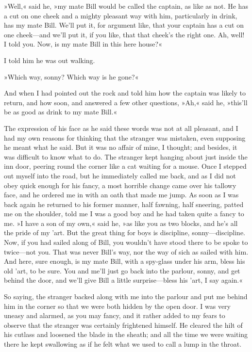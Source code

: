 »Well,« said he, »my mate Bill would be called the captain, as like as not. He has a cut on one cheek and a mighty pleasant way with him, particularly in drink, has my mate Bill. We'll put it, for argument like, that your captain has a cut on one cheek—and we'll put it, if you like, that that cheek's the right one. Ah, well! I told you. Now, is my mate Bill in this here house?«

I told him he was out walking.

»Which way, sonny? Which way is he gone?«

And when I had pointed out the rock and told him how the captain was likely to return, and how soon, and answered a few other questions, »Ah,« said he, »this'll be as good as drink to my mate Bill.«

The expression of his face as he said these words was not at all pleasant, and I had my own reasons for thinking that the stranger was mistaken, even supposing he meant what he said. But it was no affair of mine, I thought; and besides, it was difficult to know what to do. The stranger kept hanging about just inside the inn door, peering round the corner like a cat waiting for a mouse. Once I stepped out myself into the road, but he immediately called me back, and as I did not obey quick enough for his fancy, a most horrible change came over his tallowy face, and he ordered me in with an oath that made me jump. As soon as I was back again he returned to his former manner, half fawning, half sneering, patted me on the shoulder, told me I was a good boy and he had taken quite a fancy to me. »I have a son of my own,« said he, »as like you as two blocks, and he's all the pride of my 'art. But the great thing for boys is discipline, sonny—discipline. Now, if you had sailed along of Bill, you wouldn't have stood there to be spoke to twice—not you. That was never Bill's way, nor the way of sich as sailed with him. And here, sure enough, is my mate Bill, with a spy-glass under his arm, bless his old 'art, to be sure. You and me'll just go back into the parlour, sonny, and get behind the door, and we'll give Bill a little surprise—bless his 'art, I say again.«

So saying, the stranger backed along with me into the parlour and put me behind him in the corner so that we were both hidden by the open door. I was very uneasy and alarmed, as you may fancy, and it rather added to my fears to observe that the stranger was certainly frightened himself. He cleared the hilt of his cutlass and loosened the blade in the sheath; and all the time we were waiting there he kept swallowing as if he felt what we used to call a lump in the throat.


